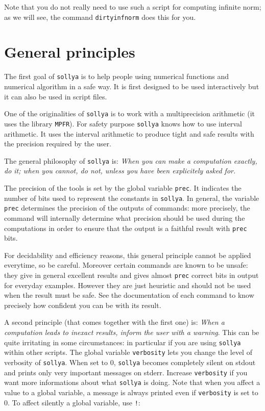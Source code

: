 \documentclass[a4paper]{article}
\newcommand{\com}[1]{\texttt{#1}}
\newcommand{\key}[1]{\texttt{#1}}
\newcommand{\sollya}{\texttt{sollya}\xspace}
\begin{document}
Note that you do not really need to use such a script for computing infinite norm; as we will see, the command \com{dirtyinfnorm} does this for you.

\section{General principles}
The first goal of \sollya is to help people using numerical functions and numerical algorithm in a safe way. It is first designed to be used interactively but it can also be used in script files.

One of the originalities of \sollya is to work with a multiprecision arithmetic (it uses the library \texttt{MPFR}). For safety purpose \sollya knows how to use interval arithmetic. It uses the interval arithmetic to produce tight and safe results with the precision required by the user.

The general philosophy of \sollya is: \emph{When you can make a computation exactly, do it; when you cannot, do not, unless you have been explicitely asked for.}

The precision of the tools is set by the global variable \key{prec}. It indicates the number of bits used to represent the constants in \sollya. In general, the variable \key{prec} determines the precision of the outputs of commands: more precisely, the command will internally determine what precision should be used during the computations in order to ensure that the output is a faithful result with \key{prec} bits.

For decidability and efficiency reasons, this general principle cannot be applied everytime, so be careful. Moreover certain commands are known to be unsafe: they give in general excellent results and gives almost \key{prec} correct bits in output for everyday examples. However they are just heuristic and should not be used when the result must be safe. See the documentation of each command to know precisely how confident you can be with its result.

A second principle (that comes together with the first one) is: \emph{When a computation leads to inexact results, inform the user with a warning}. This can be quite irritating in some circumstances: in particular if you are using \sollya within other scripts. The global variable \key{verbosity} lets you change the level of verbosity of \sollya. When set to $0$, \sollya becomes completely silent on stdout and prints only very important messages on stderr. Increase \key{verbosity} if you want more informations about what \sollya is doing. Note that when you affect a value to a global variable, a message is always printed even if \com{verbosity} is set to $0$. To affect silently a global variable, use \texttt{!}:
\end{document}
